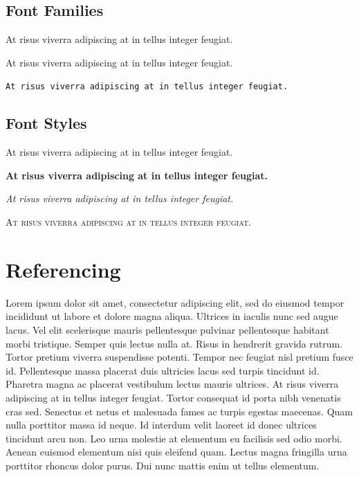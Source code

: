 \documentclass[a4paper, 12pt]{report}
\begin{document}
\section{Font Families}
\textrm{At risus viverra adipiscing at in tellus integer feugiat.}

\textsf{At risus viverra adipiscing at in tellus integer feugiat.}

\texttt{At risus viverra adipiscing at in tellus integer feugiat.}

\section{Font Styles}
\textmd{At risus viverra adipiscing at in tellus integer feugiat.}

\textbf{At risus viverra adipiscing at in tellus integer feugiat.}

\textsl{At risus viverra adipiscing at in tellus integer feugiat.}

\textsc{At risus viverra adipiscing at in tellus integer feugiat.}




\chapter{Referencing}
Lorem ipsum dolor sit amet, consectetur adipiscing elit, sed do eiusmod tempor incididunt ut labore et dolore magna aliqua. Ultrices in iaculis nunc sed augue lacus. Vel elit scelerisque mauris pellentesque pulvinar pellentesque habitant morbi tristique. Semper quis lectus nulla at. Risus in hendrerit gravida rutrum. Tortor pretium viverra suspendisse potenti. Tempor nec feugiat nisl pretium fusce id. Pellentesque massa placerat duis ultricies lacus sed turpis tincidunt id. Pharetra magna ac placerat vestibulum lectus mauris ultrices. At risus viverra adipiscing at in tellus integer feugiat. Tortor consequat id porta nibh venenatis cras sed. Senectus et netus et malesuada fames ac turpis egestas maecenas. Quam nulla porttitor massa id neque. Id interdum velit laoreet id donec ultrices tincidunt arcu non. Leo urna molestie at elementum eu facilisis sed odio morbi. Aenean euismod elementum nisi quis eleifend quam. Lectus magna fringilla urna porttitor rhoncus dolor purus. Dui nunc mattis enim ut tellus elementum. \citep{4160265}
\end{document}
